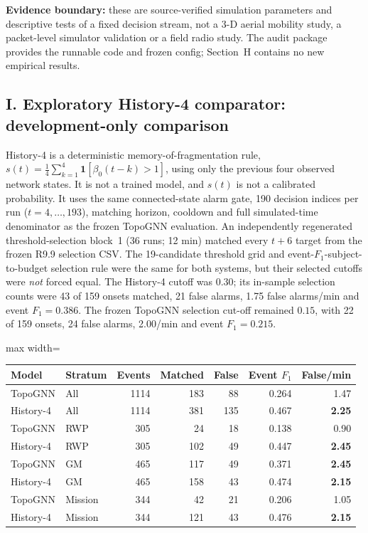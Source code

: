 \documentclass[10pt,a4paper]{article}
\begin{document}
\textbf{Evidence boundary:} these are source-verified simulation parameters and descriptive tests of a fixed decision stream, not a 3-D aerial mobility study, a packet-level simulator validation or a field radio study. The audit package provides the runnable code and frozen config; Section~H contains no new empirical results.

\newpage
\subsection*{I. Exploratory History-4 comparator: development-only comparison}
\noindent History-4 is a deterministic memory-of-fragmentation rule, $s(t)=\frac{1}{4}\sum_{k=1}^{4}\mathbf{1}[\beta_0(t-k)>1]$, using only the previous four observed network states. It is not a trained model, and $s(t)$ is not a calibrated probability. It uses the same connected-state alarm gate, 190 decision indices per run ($t=4,\ldots,193$), matching horizon, cooldown and full simulated-time denominator as the frozen TopoGNN evaluation. An independently regenerated threshold-selection block~1 (36 runs; 12 min) matched every $t+6$ target from the frozen R9.9 selection CSV. The 19-candidate threshold grid and event-$F_1$-subject-to-budget selection rule were the same for both systems, but their selected cutoffs were \emph{not} forced equal. The History-4 cutoff was $0.30$; its in-sample selection counts were 43 of 159 onsets matched, 21 false alarms, 1.75 false alarms/min and event $F_1=0.386$. The frozen TopoGNN selection cut-off remained $0.15$, with 22 of 159 onsets, 24 false alarms, 2.00/min and event $F_1=0.215$.

\begin{center}
\small
\setlength{\tabcolsep}{4pt}
\begin{adjustbox}{max width=\linewidth}\begin{tabular}{llrrrrr}
\toprule
Model & Stratum & Events & Matched & False & Event $F_1$ & False/min \\
\midrule
TopoGNN & All & 1114 & 183 & 88 & 0.264 & 1.47 \\
History-4 & All & 1114 & 381 & 135 & 0.467 & \textbf{2.25} \\
TopoGNN & RWP & 305 & 24 & 18 & 0.138 & 0.90 \\
History-4 & RWP & 305 & 102 & 49 & 0.447 & \textbf{2.45} \\
TopoGNN & GM & 465 & 117 & 49 & 0.371 & \textbf{2.45} \\
History-4 & GM & 465 & 158 & 43 & 0.474 & \textbf{2.15} \\
TopoGNN & Mission & 344 & 42 & 21 & 0.206 & 1.05 \\
History-4 & Mission & 344 & 121 & 43 & 0.476 & \textbf{2.15} \\
\bottomrule
\end{tabular}\end{adjustbox}
\end{center}
\end{document}
